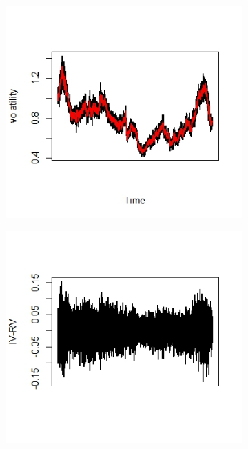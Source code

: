 \documentclass{article}
\begin{document}
\begin{figure}[h]
    \centering
    \begin{subfigure}{0.32\textwidth}
        \centering
        \includegraphics[width=\textwidth]{ex6_IVRV1.jpeg}
    \end{subfigure}\hfill
    \begin{subfigure}{0.32\textwidth}
        \centering
        \includegraphics[width=\textwidth]{ex6_IVRV2.jpeg}

\end{subfigure}
\end{figure}
\end{document}

